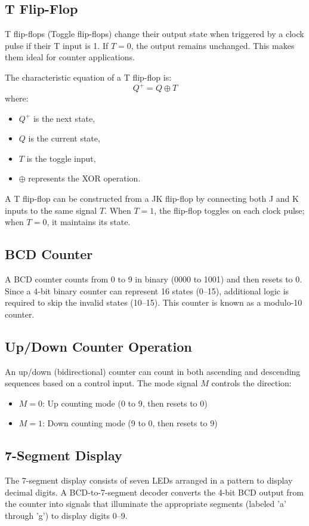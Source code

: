 \documentclass[12pt]{article}
\begin{document}
\subsection*{T Flip-Flop}
T flip-flops (Toggle flip-flops) change their output state when triggered by a clock pulse if their T input is 1. If \(T=0\), the output remains unchanged. This makes them ideal for counter applications.

The characteristic equation of a T flip-flop is:
\[
Q^+ = Q \oplus T
\]
where:
\begin{itemize}
    \item \(Q^+\) is the next state,
    \item \(Q\) is the current state,
    \item \(T\) is the toggle input,
    \item \(\oplus\) represents the XOR operation.
\end{itemize}

A T flip-flop can be constructed from a JK flip-flop by connecting both J and K inputs to the same signal \(T\). When \(T=1\), the flip-flop toggles on each clock pulse; when \(T=0\), it maintains its state.

\subsection*{BCD Counter}
A BCD counter counts from 0 to 9 in binary (0000 to 1001) and then resets to 0. Since a 4-bit binary counter can represent 16 states (0--15), additional logic is required to skip the invalid states (10--15). This counter is known as a modulo-10 counter.

\subsection*{Up/Down Counter Operation}
An up/down (bidirectional) counter can count in both ascending and descending sequences based on a control input. The mode signal \(M\) controls the direction:
\begin{itemize}
    \item \(M = 0\): Up counting mode (0 to 9, then resets to 0)
    \item \(M = 1\): Down counting mode (9 to 0, then resets to 9)
\end{itemize}

\subsection*{7-Segment Display}
The 7-segment display consists of seven LEDs arranged in a pattern to display decimal digits. A BCD-to-7-segment decoder converts the 4-bit BCD output from the counter into signals that illuminate the appropriate segments (labeled 'a' through 'g') to display digits 0--9.
\end{document}
